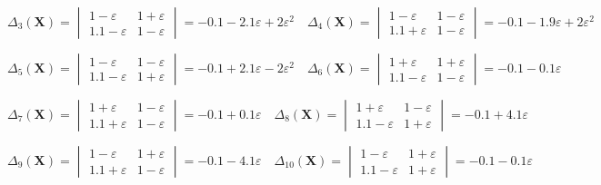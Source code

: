 \begin{equation}
\Delta_3(\textbf{X})=
\begin{vmatrix}
1-\varepsilon & 1+\varepsilon \\
1.1-\varepsilon & 1-\varepsilon 
\end{vmatrix}
=-0.1-2.1\varepsilon+2\varepsilon^2
\quad
\Delta_4(\textbf{X})=
\begin{vmatrix}
1-\varepsilon & 1-\varepsilon \\
1.1+\varepsilon & 1-\varepsilon 
\end{vmatrix}
=-0.1-1.9\varepsilon+2\varepsilon^2
\end{equation}

\begin{equation}
\Delta_5(\textbf{X})=
\begin{vmatrix}
1-\varepsilon & 1-\varepsilon \\
1.1-\varepsilon & 1+\varepsilon 
\end{vmatrix}
=-0.1+2.1\varepsilon-2\varepsilon^2
\quad
\Delta_6(\textbf{X})=
\begin{vmatrix}
1+\varepsilon & 1+\varepsilon \\
1.1-\varepsilon & 1-\varepsilon 
\end{vmatrix}
=-0.1-0.1\varepsilon
\end{equation}

\begin{equation}
\Delta_7(\textbf{X})=
\begin{vmatrix}
1+\varepsilon & 1-\varepsilon \\
1.1+\varepsilon & 1-\varepsilon 
\end{vmatrix}
=-0.1+0.1\varepsilon
\quad
\Delta_8(\textbf{X})=
\begin{vmatrix}
1+\varepsilon & 1-\varepsilon \\
1.1-\varepsilon & 1+\varepsilon 
\end{vmatrix}
=-0.1+4.1\varepsilon
\end{equation}

\begin{equation}
\Delta_9(\textbf{X})=
\begin{vmatrix}
1-\varepsilon & 1+\varepsilon \\
1.1+\varepsilon & 1-\varepsilon 
\end{vmatrix}
=-0.1-4.1\varepsilon
\quad
\Delta_{10}(\textbf{X})=
\begin{vmatrix}
1-\varepsilon & 1+\varepsilon \\
1.1-\varepsilon & 1+\varepsilon 
\end{vmatrix}
=-0.1-0.1\varepsilon
\end{equation}


